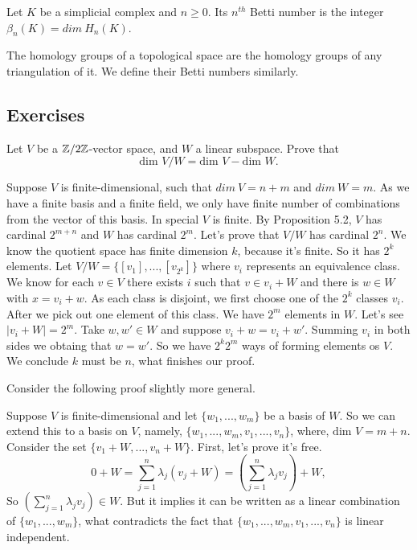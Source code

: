 \begin{definition}
    Let $K$ be a simplicial complex and $n \ge 0$. Its $n^{th}$ Betti number
    is the integer $\beta_n(K) = dim~ H_n(K)$.
\end{definition}

\begin{definition}
    The homology groups of a topological space are the homology groups of any triangulation of it. We define their Betti numbers similarly.
\end{definition}

\subsection{Exercises}

\begin{exercise}
    Let $V$ be a $\mathbb{Z}/2\mathbb{Z}$-vector space, and $W$ a linear subspace. Prove that
    $$\text{dim } V /W = \text{dim } V - \text{dim } W  .$$
\end{exercise}

Suppose $V$ is finite-dimensional, such that $dim ~V = n + m$ and $dim ~W =
m$. As we have a finite basis and a finite field, we only have finite
number of combinations from the vector of this basis. In special $V$ is finite. By Proposition 5.2,
$V$ has cardinal $2^{m+n}$ and $W$ has cardinal $2^m$. Let's prove that $V/W$
has cardinal $2^n$. We know the quotient space has finite dimension $k$, because
it's finite. So it has $2^k$ elements. Let $V/W = \{[v_1], ..., [v_{2^k}]\}$ where
$v_i$ represents an equivalence class. We know for each $v \in V$ there
exists $i$ such that $v \in v_i + W$ and there is $w \in W$ with $x =
v_i + w$. As each class is disjoint, we first choose one of the $2^k$ classes
$v_i$. After we pick out one element of this class. We have $2^m$ elements in
$W$. Let's see $|v_i + W| = 2^m$. Take $w, w' \in W$ and  suppose $v_i + w =
v_i + w'$. Summing $v_i$ in both sides we obtaing that $w = w'$. So we have
$2^k 2^m$ ways
of forming elements os $V$. We conclude $k$ must be $n$, what finishes our proof. 

\begin{remark}
    Consider the following proof slightly more general. 
\end{remark}

Suppose $V$ is finite-dimensional and let $\{w_1, ..., w_m\}$ be a basis of
$W$. So we can extend this to a basis on $V$, namely, $\{w_1, ..., w_m, v_1,
..., v_{n}\}$, where, $\text{dim } V = m + n$. Consider the set $\{v_1 + W, ...,
v_n + W\}.$ First, let's prove it's free.
$$
0 + W = \sum_{j=1}^n \lambda_j(v_j + W) = \left(\sum_{j=1}^n \lambda_j v_j \right) + W, 
$$
So $\left(\sum_{j=1}^n \lambda_j v_j \right) \in W$. But it implies it can be
written as a linear combination of $\{w_1, ..., w_m\}$, what contradicts the
fact that $\{w_1, ..., w_m, v_1,
..., v_{n}\}$ is linear independent. 

